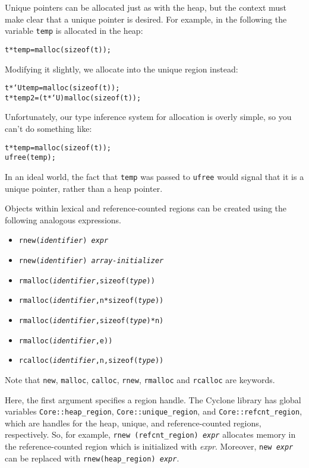Unique pointers can be allocated just as with the heap, but the context must
make clear that a unique pointer is desired.  For example, in the following
the variable \texttt{temp} is allocated in the heap:
\begin{alltt}
  t * temp = malloc(sizeof(t));
\end{alltt}
Modifying it slightly, we allocate into the unique region instead:
\begin{alltt}
  t *`U temp  =        malloc(sizeof(t));
  t *   temp2 = (t *`U)malloc(sizeof(t));
\end{alltt}
Unfortunately, our type inference system for allocation is overly simple, so
you can't do something like:
\begin{alltt}
  t * temp = malloc(sizeof(t));
  ufree(temp);
\end{alltt}
In an ideal world, the fact that \texttt{temp} was passed to \texttt{ufree}
would signal that it is a unique pointer, rather than a heap pointer.

Objects within lexical and reference-counted regions can be created using
the following analogous expressions.
\begin{itemize}
\item \texttt{rnew({\it identifier}) {\it expr}}
\item \texttt{rnew({\it identifier}) {\it array-initializer}}
\item \texttt{rmalloc({\it identifier},sizeof({\it type}))}
\item \texttt{rmalloc({\it identifier},n*sizeof({\it type}))}
\item \texttt{rmalloc({\it identifier},sizeof({\it type})*n)}
\item \texttt{rmalloc({\it identifier},e))}
\item \texttt{rcalloc({\it identifier},n,sizeof({\it type}))}
\end{itemize}
Note that \texttt{new}, \texttt{malloc}, \texttt{calloc}, 
\texttt{rnew}, \texttt{rmalloc} and \texttt{rcalloc} are keywords.

Here, the first argument specifies a region handle.  The Cyclone library has
global variables \texttt{Core::heap_region}, \texttt{Core::unique_region},
and \texttt{Core::refcnt\_region}, which are handles for the heap, unique,
and reference-counted regions, respectively.  So, for example, \texttt{rnew
(refcnt_region) {\it expr}} allocates memory in the reference-counted region
which is initialized with {\it expr}.  Moreover, \texttt{new {\it expr}} can
be replaced with \texttt{rnew(heap_region) {\it expr}}.

